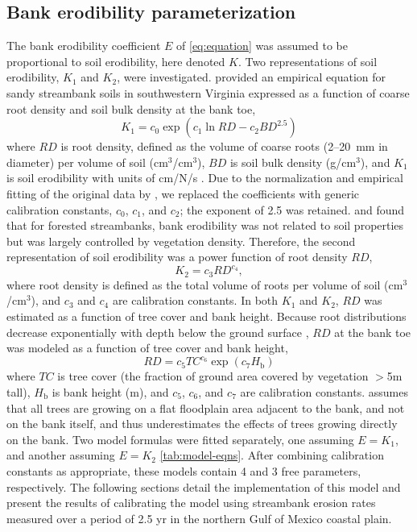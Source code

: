 \documentclass[preprint, review, authoryear, 12pt]{elsarticle}
\begin{document}
\subsection{Bank erodibility parameterization}

The bank erodibility coefficient $E$ of \cref{eq:equation} was assumed to be proportional to soil erodibility, here denoted $K$. Two representations of soil erodibility, $K_1$ and $K_2$, were investigated. \citet{Wynn2006} provided an empirical equation for sandy streambank soils in southwestern Virginia expressed as a function of coarse root density and soil bulk density at the bank toe,
\begin{equation}\label{eq:wynn}
K_1 = c_0\exp \left(c_1\ln\mathit{RD} - c_2\mathit{BD}^{2.5}\right)
\end{equation}
where $\mathit{RD}$ is root density, defined as the volume of coarse roots (2--20~mm in diameter) per volume of soil (cm$^3$/cm$^3$), $\mathit{BD}$ is soil bulk density (g/cm$^3$), and $K_1$ is soil erodibility with units of cm/N/s \citep{Wynn2006}. Due to the normalization and empirical fitting of the original data by \citet{Wynn2006}, we replaced the coefficients with generic calibration constants, $c_0$, $c_1$, and $c_2$; the exponent of 2.5 was retained. \citet{Pizzuto1984} and \citet{Pizzuto1989} found that for forested streambanks, bank erodibility was not related to soil properties but was largely controlled by vegetation density. Therefore, the second representation of soil erodibility was a power function of root density $\mathit{RD}$,
\begin{equation}\label{eq:k2}
K_2 = c_3 \mathit{RD}^{c_4},
\end{equation}
where root density is defined as the total volume of roots per volume of soil (cm$^3$/cm$^3$), and $c_3$ and $c_4$ are calibration constants. In both $K_1$ and $K_2$, $\mathit{RD}$ was estimated as a function of tree cover and bank height. Because root distributions decrease exponentially with depth below the ground surface \citep{Zeng2001}, $\mathit{RD}$ at the bank toe was modeled as a function of tree cover and bank height,
\begin{equation}\label{eq:rd}
\mathit{RD} = c_5\mathit{TC}^{c_6} \exp(c_7 H_\text{b})
\end{equation}
where $\mathit{TC}$ is tree cover (the fraction of ground area covered by vegetation $>$5m tall), $H_\text{b}$ is bank height (m), and $c_5$, $c_6$, and $c_7$ are calibration constants.  assumes that all trees are growing on a flat floodplain area adjacent to the bank, and not on the bank itself, and thus underestimates the effects of trees growing directly on the bank. Two model formulas were fitted separately, one assuming $E=K_1$, and another assuming $E=K_2$ \cref{tab:model-eqns}. After combining calibration constants as appropriate, these models contain 4 and 3 free parameters, respectively. The following sections detail the implementation of this model and present the results of calibrating the model using streambank erosion rates measured over a period of 2.5 yr in the northern Gulf of Mexico coastal plain.
\end{document}
